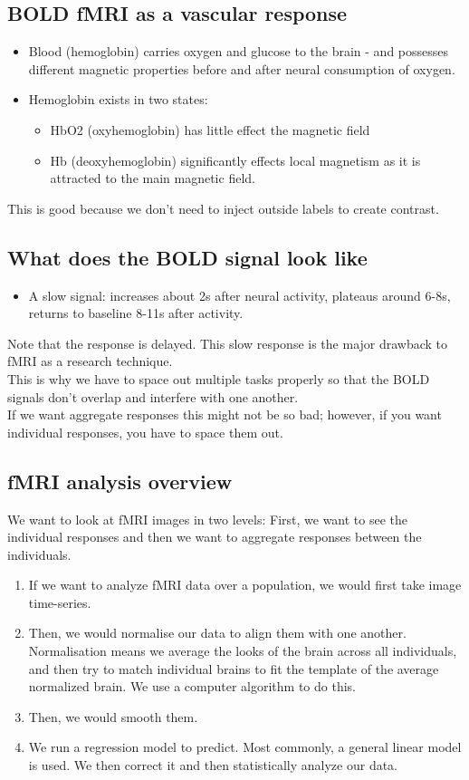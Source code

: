 \subsection{BOLD fMRI as a vascular response}
\begin{itemize}
    \item Blood (hemoglobin) carries oxygen and glucose to the brain - and possesses different magnetic properties before and after neural consumption of oxygen.
    \item Hemoglobin exists in two states:
    \begin{itemize}
        \item HbO2 (oxyhemoglobin) has little effect the magnetic field
        \item Hb (deoxyhemoglobin) significantly effects local magnetism as it is attracted to the main magnetic field.
    \end{itemize}
\end{itemize}
This is good because we don't need to inject outside labels to create contrast.

\subsection{
What does the BOLD signal look like
}
\begin{itemize}
    \item A slow signal: increases about 2s after neural activity, plateaus around 6-8s, returns to baseline 8-11s after activity.

\end{itemize}
Note that the response is delayed. This slow response is the major drawback to fMRI as a research technique.
\\This is why we have to space out multiple tasks properly so that the BOLD signals don't overlap and interfere with one another.
\\If we want aggregate responses this might not be so bad; however, if you want individual responses, you have to space them out.
\subsection{fMRI analysis overview}
We want to look at fMRI images in two levels: First, we want to see the individual responses and then we want to aggregate responses between the individuals.
\begin{enumerate}
    \item If we want to analyze fMRI data over a population, we would first take image time-series.
    \item Then, we would normalise our data to align them with one another. Normalisation means we average the looks of the brain across all individuals, and then try to match individual brains to fit the template of the average normalized brain. We use a computer algorithm to do this.
    \item Then, we would smooth them. 
    \item We run a regression model to predict. Most commonly, a general linear model is used. We then correct it and then statistically analyze our data.
\end{enumerate}
